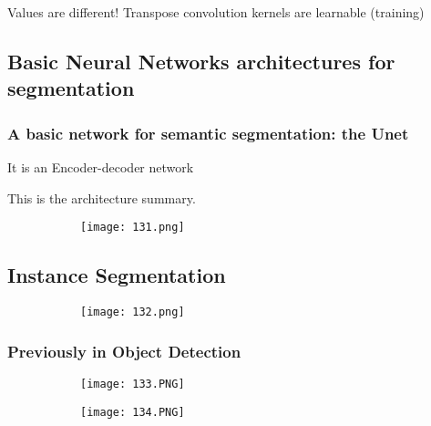 \documentclass{article}
\begin{document}
Values are different! Transpose convolution kernels are learnable (training)

\vspace{20mm}

\subsection{Basic Neural Networks architectures for segmentation}

\subsubsection{A basic network for semantic segmentation: the Unet}

It is an Encoder-decoder network

This is the architecture summary.

\begin{figure}[ht!]
  \centering
  \begin{subfigure}[b]{0.7\linewidth}
    \texttt{[image: 131.png]}
  \end{subfigure}
\end{figure}

\subsection{Instance Segmentation}

\begin{figure}[ht!]
  \centering
  \begin{subfigure}[b]{0.7\linewidth}
    \texttt{[image: 132.png]}
  \end{subfigure}
\end{figure}

\subsubsection{Previously in Object Detection}


\begin{figure}[ht!]
  \centering
  \begin{subfigure}[b]{0.5\linewidth}
    \texttt{[image: 133.PNG]}
  \end{subfigure}
     \begin{subfigure}[b]{0.49\textwidth}
         \centering
         \texttt{[image: 134.PNG]}
     \end{subfigure}
\end{figure}
\end{document}
